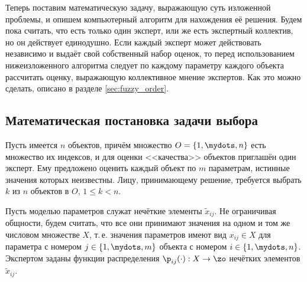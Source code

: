 
Теперь поставим математическую задачу, выражающую суть изложенной проблемы, и опишем компьютерный алгоритм для нахождения её решения. Будем пока считать, что есть только один эксперт, или же есть экспертный коллектив, но он действует единодушно. Если каждый эксперт может действовать независимо и выдаёт свой собственный набор оценок, то перед использованием нижеизложенного алгоритма следует по каждому параметру каждого объекта рассчитать оценку, выражающую коллективное мнение экспертов. Как это можно сделать, описано в разделе \ref{sec:fuzzy_order}.

\subsection{Математическая постановка задачи выбора} %

Пусть имеется $n$ объектов, причём множество $O = \{1, \mydots, n\}$ есть множество их индексов, и для оценки <<качества>> объектов приглашён один эксперт. Ему предложено оценить каждый объект по $m$ параметрам, истинные значения которых неизвестны. Лицу, принимающему решение, требуется  выбрать $k$ из $n$ объектов в $O$, $1 \leq k < n$.

Пусть моделью параметров служат нечёткие элементы $\tilde x_{ij}$. Не ограничивая общности, будем считать, что все они принимают значения на одном и том же числовом множестве $X$, т.\,е. значения параметров имеют вид $x_{ij} \in X$ для параметра с номером $j \in \{1, \mydots, m\}$ объекта с номером $i \in \{1, \mydots, n\}$. Экспертом заданы функции распределения $\p_{ij}(\cdot): X \rightarrow \zo$ нечётких элементов $\tilde x_{ij}$. 

